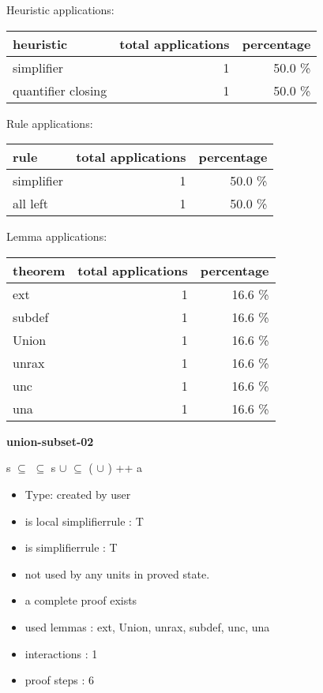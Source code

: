 \documentclass[a4paper]{article}
\begin{document}
\medskip


Heuristic applications:

\begin{supertabular}{l|r|r}
heuristic	& total applications & percentage \\ \hline
simplifier & 1 & 50.0 \% \\
quantifier closing & 1 & 50.0 \% \\

\end{supertabular}

Rule applications:

\begin{supertabular}{l|r|r}
rule	        & total applications & percentage \\ \hline
simplifier & 1 & 50.0 \% \\
all left & 1 & 50.0 \% \\

\end{supertabular}

Lemma applications:

\begin{supertabular}{l|r|r}
theorem	        & total applications & percentage \\ \hline
ext & 1 & 16.6 \% \\
subdef & 1 & 16.6 \% \\
Union & 1 & 16.6 \% \\
unrax & 1 & 16.6 \% \\
unc & 1 & 16.6 \% \\
una & 1 & 16.6 \% \\

\end{supertabular}
\pagebreak

{\LARGE\bf union-subset-02}\label{lemma-union-subset-02}

\medskip

 \Fol s $\subseteq$  \And {} $\subseteq$  \Imp s $\cup$  $\subseteq$ ( $\cup$ ) ++ a

\begin{itemize}

\item Type: created by user

\item is local simplifierrule : T
\item is simplifierrule : T
\item not used by any units in proved state.
\item       a complete proof exists
\item       used lemmas  : ext, Union, unrax, subdef, unc, una
\item       interactions : 1
\item       proof steps  : 6
\end{itemize}
\end{document}
